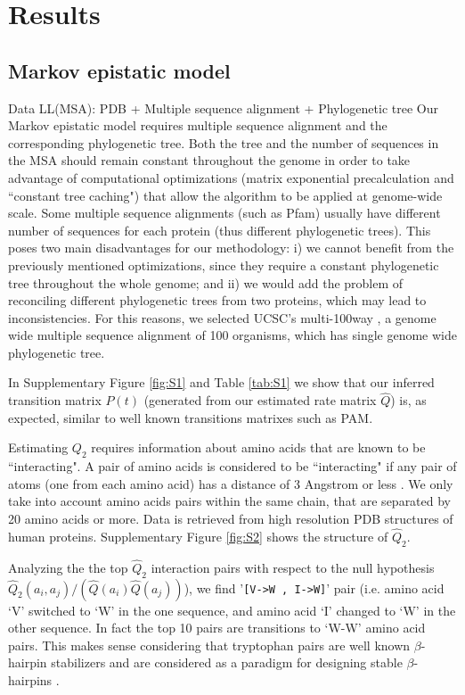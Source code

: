 \section{Results}

\subsection{Markov epistatic model}

Data LL(MSA): PDB + Multiple sequence alignment + Phylogenetic tree
Our Markov epistatic model requires multiple sequence alignment and the corresponding phylogenetic tree. Both the tree and the number of sequences in the MSA should remain constant throughout the genome in order to take advantage of computational optimizations (matrix exponential precalculation and ``constant tree caching") that allow the algorithm to be applied at genome-wide scale. Some multiple sequence alignments (such as Pfam) usually have different number of sequences for each protein (thus different phylogenetic trees). This poses two main disadvantages for our methodology: i) we cannot benefit from the previously mentioned optimizations, since they require a constant phylogenetic tree throughout the whole genome; and ii) we would add the problem of reconciling different phylogenetic trees from two proteins, which may lead to inconsistencies. For this reasons, we selected UCSC’s multi-100way \cite{karolchik2014ucsc}, a genome wide multiple sequence alignment of 100 organisms, which has single genome wide phylogenetic tree.

In Supplementary Figure \ref{fig:S1} and Table \ref{tab:S1} we show that our inferred transition matrix $P(t)$ (generated from our estimated rate matrix $\hat{Q}$) is, as expected, similar to well known transitions matrixes such as PAM.

Estimating $Q_2$ requires information about amino acids that are known to be ``interacting". A pair of amino acids is considered to be ``interacting" if any pair of atoms (one from each amino acid) has a distance of 3 Angstrom or less \cite{burger2010disentangling}. We only take into account amino acids pairs within the same chain, that are separated by 20 amino acids or more. Data is retrieved from high resolution PDB structures of human proteins. Supplementary Figure \ref{fig:S2} shows the structure of $\hat{Q}_2$.

Analyzing the the top $\hat{Q}_2$ interaction pairs with respect to the null hypothesis $\hat{Q}_2(a_i, a_j) / (\hat{Q}(a_i) \hat{Q}(a_j)) $), we find '\texttt{[V->W ,  I->W]}' pair (i.e. amino acid ‘V’ switched to ‘W’ in the one sequence, and amino acid ‘I’ changed to ‘W’ in the other sequence. In fact the top 10 pairs are transitions to ‘W-W’ amino acid pairs. This makes sense considering that tryptophan pairs are well known $\beta$-hairpin stabilizers and are considered as a paradigm for designing stable $\beta$-hairpins \cite{santiveri2010tryptophan}.


